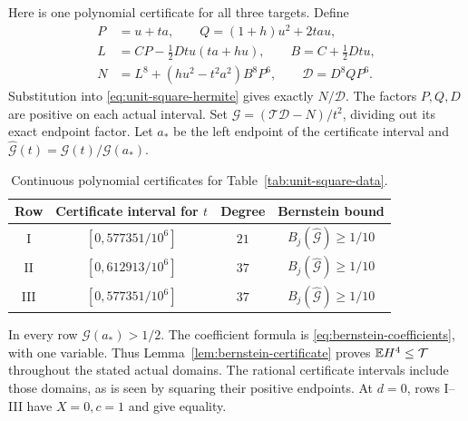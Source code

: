 Here is one polynomial certificate for all three targets. Define
\[
 \begin{split}
 P&=u+ta,\qquad Q=(1+h)u^2+2tau,\\
 L&=CP-\tfrac12Dtu(ta+hu),\qquad B=C+\tfrac12Dtu,\\
 N&=L^8+(hu^2-t^2a^2)B^8P^6,\qquad
 \mathcal D=D^8QP^6.
 \end{split}
\]
Substitution into \eqref{eq:unit-square-hermite} gives exactly
$N/\mathcal D$. The factors $P,Q,D$ are positive on each actual
interval. Set $\mathcal G=(\mathcal T\mathcal D-N)/t^2$, dividing out its exact endpoint factor.
Let $a_*$ be the left endpoint of the certificate interval and
$\widehat{\mathcal G}(t)=\mathcal G(t)/\mathcal G(a_*)$.
\begingroup\small
\begin{longtable}{@{}cccc@{}}
\caption{Continuous polynomial certificates for Table~\ref{tab:unit-square-data}.}
\label{tab:unit-square-certificates}\\
\toprule
Row & Certificate interval for $t$ & Degree & Bernstein bound\\\midrule
I & $[0,577351/10^6]$ & $21$ & $B_j(\widehat{\mathcal G})\ge1/10$\\
II & $[0,612913/10^6]$ & $37$ & $B_j(\widehat{\mathcal G})\ge1/10$\\
III & $[0,577351/10^6]$ & $37$ & $B_j(\widehat{\mathcal G})\ge1/10$\\\bottomrule
\end{longtable}
\endgroup
In every row $\mathcal G(a_*)>1/2$. The coefficient formula is
\eqref{eq:bernstein-coefficients}, with one variable. Thus Lemma~\ref{lem:bernstein-certificate}
proves $\mathbb E H^4\le\mathcal T$ throughout the stated actual domains.
The rational certificate intervals include those domains, as is seen
by squaring their positive endpoints. At $d=0$, rows I--III have
$X=0,c=1$ and give equality.

